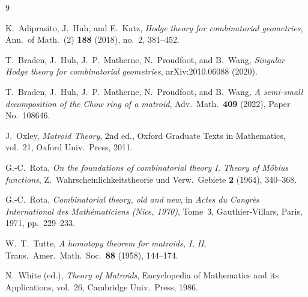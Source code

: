 \documentclass[11pt]{article}
\theoremstyle{definition}
\theoremstyle{remark}
\begin{document}
\begin{thebibliography}{9}

K.~Adiprasito, J.~Huh, and E.~Katz,
\emph{Hodge theory for combinatorial geometries},
Ann.\ of Math.\ (2) \textbf{188} (2018), no.~2, 381--452.

T.~Braden, J.~Huh, J.~P.~Matherne, N.~Proudfoot, and B.~Wang,
\emph{Singular Hodge theory for combinatorial geometries},
arXiv:2010.06088 (2020).

T.~Braden, J.~Huh, J.~P.~Matherne, N.~Proudfoot, and B.~Wang,
\emph{A semi-small decomposition of the Chow ring of a matroid},
Adv.\ Math.\ \textbf{409} (2022), Paper No.~108646.

J.~Oxley,
\emph{Matroid Theory}, 2nd ed.,
Oxford Graduate Texts in Mathematics, vol.~21, Oxford Univ.\ Press, 2011.

G.-C.~Rota,
\emph{On the foundations of combinatorial theory I. Theory of M\"obius functions},
Z.\ Wahrscheinlichkeitstheorie und Verw.\ Gebiete \textbf{2} (1964), 340--368.

G.-C.~Rota,
\emph{Combinatorial theory, old and new},
in \emph{Actes du Congr\`es International des Math\'ematiciens (Nice, 1970)}, Tome~3,
Gauthier-Villars, Paris, 1971, pp.~229--233.

W.~T.~Tutte,
\emph{A homotopy theorem for matroids, I, II},
Trans.\ Amer.\ Math.\ Soc.\ \textbf{88} (1958), 144--174.

N.~White (ed.),
\emph{Theory of Matroids},
Encyclopedia of Mathematics and its Applications, vol.~26, Cambridge Univ.\ Press, 1986.

\end{thebibliography}
\end{document}
